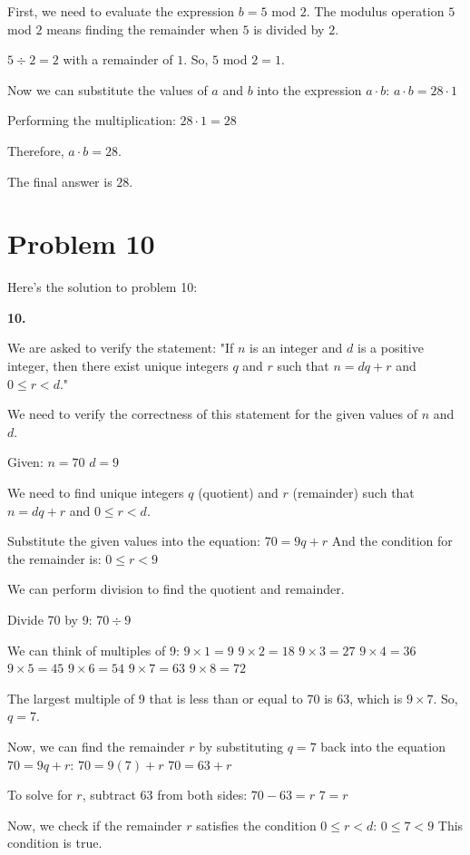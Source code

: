 \documentclass{article}
\begin{document}
First, we need to evaluate the expression $b = 5$ mod $2$.
The modulus operation $5$ mod $2$ means finding the remainder when $5$ is divided by $2$.

$5 \div 2 = 2$ with a remainder of $1$.
So, $5$ mod $2 = 1$.

Now we can substitute the values of $a$ and $b$ into the expression $a \cdot b$:
$a \cdot b = 28 \cdot 1$

Performing the multiplication:
$28 \cdot 1 = 28$

Therefore, $a \cdot b = 28$.

The final answer is $\boxed{28}$.

\newpage

\section*{\textbf{Problem 10}}
Here's the solution to problem 10:

\textbf{10.}

We are asked to verify the statement: "If $n$ is an integer and $d$ is a positive integer, then there exist unique integers $q$ and $r$ such that $n = dq + r$ and $0 \leq r < d$."

We need to verify the correctness of this statement for the given values of $n$ and $d$.

Given:
$n = 70$
$d = 9$

We need to find unique integers $q$ (quotient) and $r$ (remainder) such that $n = dq + r$ and $0 \leq r < d$.

Substitute the given values into the equation:
$70 = 9q + r$
And the condition for the remainder is:
$0 \leq r < 9$

We can perform division to find the quotient and remainder.

Divide 70 by 9:
$70 \div 9$

We can think of multiples of 9:
$9 \times 1 = 9$
$9 \times 2 = 18$
$9 \times 3 = 27$
$9 \times 4 = 36$
$9 \times 5 = 45$
$9 \times 6 = 54$
$9 \times 7 = 63$
$9 \times 8 = 72$

The largest multiple of 9 that is less than or equal to 70 is 63, which is $9 \times 7$.
So, $q = 7$.

Now, we can find the remainder $r$ by substituting $q=7$ back into the equation $70 = 9q + r$:
$70 = 9(7) + r$
$70 = 63 + r$

To solve for $r$, subtract 63 from both sides:
$70 - 63 = r$
$7 = r$

Now, we check if the remainder $r$ satisfies the condition $0 \leq r < d$:
$0 \leq 7 < 9$
This condition is true.
\end{document}
